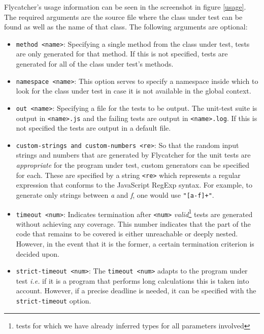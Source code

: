 \textsf{Flycatcher}'s usage information can be seen in the screenshot in figure \ref{usage}. The required arguments are the source file where the class under test can be found as well as the name of that class. The following arguments are optional:

\begin{itemize}
   \item \texttt{\textendash \textendash method <name>}: Specifying a single method from the class under test, tests are only generated for that method. If this is not specified, tests are generated for all of the class under test's methods.
   \item \texttt{\textendash \textendash namespace <name>}: This option serves to specify a namespace inside which to look for the class under test in case it is not available in the global context.
   \item \texttt{\textendash \textendash out <name>}: Specifying a file for the tests to be output. The unit-test suite is output in \texttt{<name>.js} and the failing tests are output in \texttt{<name>.log}. If this is not specified the tests are output in a default file.
   \item \texttt{\textendash \textendash custom-strings and \textendash \textendash custom-numbers <re>}: So that the random input strings and numbers that are generated by \textsf{Flycatcher} for the unit tests are \emph{appropriate} for the program under test, custom generators can be specified for each. These are specified by a string \texttt{<re>} which represents a regular expression that conforms to the JavaScript RegExp syntax. For example, to generate only strings between \emph{a} and \emph{f}, one would use \texttt{"[a-f]+"}.
   \item \texttt{\textendash \textendash timeout <num>}: Indicates termination after \texttt{<num>} \emph{valid}\footnote{tests for which we have already inferred types for all parameters involved} tests are generated without achieving any coverage. This number indicates that the part of the code that remains to be covered is either unreachable or deeply nested. However, in the event that it is the former, a certain termination criterion is decided upon.
   \item \texttt{\textendash \textendash strict-timeout <num>}: The \texttt{\textendash \textendash timeout <num>} adapts to the program under test \emph{i.e.} if it is a program that performs long calculations this is taken into account. However, if a precise deadline is needed, it can be specified with the \texttt{strict-timeout} option.

\end{itemize}

